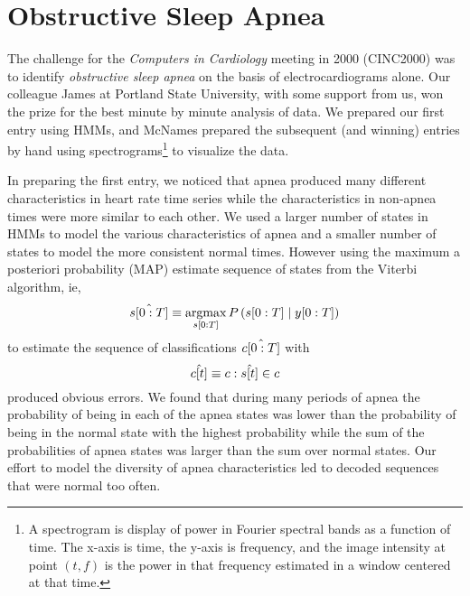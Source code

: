
\chapter{Obstructive Sleep Apnea}
\label{chap:apnea}

The challenge for the \emph{Computers in Cardiology} %
%
meeting in 2000 (CINC2000) %
%
was to identify \emph{obstructive sleep apnea} on the basis of
electrocardiograms alone.  Our colleague James  at
Portland State University, with some support from us, won the prize
for the best minute by minute analysis of data.  We prepared our first
entry using HMMs, and McNames prepared the subsequent (and winning)
entries by hand using spectrograms\footnote{A spectrogram is display
  of power in Fourier spectral bands as a function of time.  The
  x-axis is time, the y-axis is frequency, and the image intensity at
  point $(t,f)$ is the power in that frequency estimated in a window
  centered at that time.} to visualize the data.  

In preparing the first entry, we noticed that apnea produced many
different characteristics in heart rate time series while the
characteristics in non-apnea times were more similar to each other.  We
used a larger number of states in HMMs to model the various
characteristics of apnea and a smaller number of states to model the
more consistent normal times.  However using the maximum a posteriori
probability (MAP) estimate sequence of states from the Viterbi
algorithm, ie,
\begin{equation*}
  \hat {s[0:T]} \equiv
  \operatorname*{argmax}_{s[0:T]}P\left(s[0:T] \mid  y[0:T] \right)
\end{equation*}
to estimate the sequence of classifications $\hat {c[0:T]}$ with
\begin{equation*}
  \hat {{c}{[t]}} \equiv c:\hat {{s}{[t]}} \in c
\end{equation*}
produced obvious errors.  We found that during many periods of apnea
the probability of being in each of the apnea states was lower than
the probability of being in the normal state with the highest
probability while the sum of the probabilities of apnea states was
larger than the sum over normal states.  Our effort to model the
diversity of apnea characteristics led to decoded sequences that were
normal too often.

